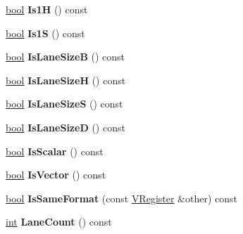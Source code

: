 \begin{DoxyCompactItemize}
\mbox{\hyperlink{classbool}{bool}} {\bfseries Is1H} () const
\item 
\mbox{\label{classv8_1_1internal_1_1VRegister_af100f4015f22484aebb5de74fbfe15bf}} 
\mbox{\hyperlink{classbool}{bool}} {\bfseries Is1S} () const
\item 
\mbox{\label{classv8_1_1internal_1_1VRegister_a533379536dd6ba89f01d4728145055e5}} 
\mbox{\hyperlink{classbool}{bool}} {\bfseries Is\+Lane\+SizeB} () const
\item 
\mbox{\label{classv8_1_1internal_1_1VRegister_a6a9c89627edaee3ff14d8b8fe9f16441}} 
\mbox{\hyperlink{classbool}{bool}} {\bfseries Is\+Lane\+SizeH} () const
\item 
\mbox{\label{classv8_1_1internal_1_1VRegister_a782e2cb3baf5f8214faef47db21b07e4}} 
\mbox{\hyperlink{classbool}{bool}} {\bfseries Is\+Lane\+SizeS} () const
\item 
\mbox{\label{classv8_1_1internal_1_1VRegister_ad5820973131efc4492d85559b87f92e5}} 
\mbox{\hyperlink{classbool}{bool}} {\bfseries Is\+Lane\+SizeD} () const
\item 
\mbox{\label{classv8_1_1internal_1_1VRegister_a81be102936a7b98f96dc19bf5c07810b}} 
\mbox{\hyperlink{classbool}{bool}} {\bfseries Is\+Scalar} () const
\item 
\mbox{\label{classv8_1_1internal_1_1VRegister_a5ebef8a3ffccb53982fd3103fea8756a}} 
\mbox{\hyperlink{classbool}{bool}} {\bfseries Is\+Vector} () const
\item 
\mbox{\label{classv8_1_1internal_1_1VRegister_aa00f1a0e0fd6192c9283f3e6047c5521}} 
\mbox{\hyperlink{classbool}{bool}} {\bfseries Is\+Same\+Format} (const \mbox{\hyperlink{classv8_1_1internal_1_1VRegister}{V\+Register}} \&other) const
\item 
\mbox{\label{classv8_1_1internal_1_1VRegister_ae5191d171b47e45363d95535f08be43c}} 
\mbox{\hyperlink{classint}{int}} {\bfseries Lane\+Count} () const

\end{DoxyCompactItemize}
